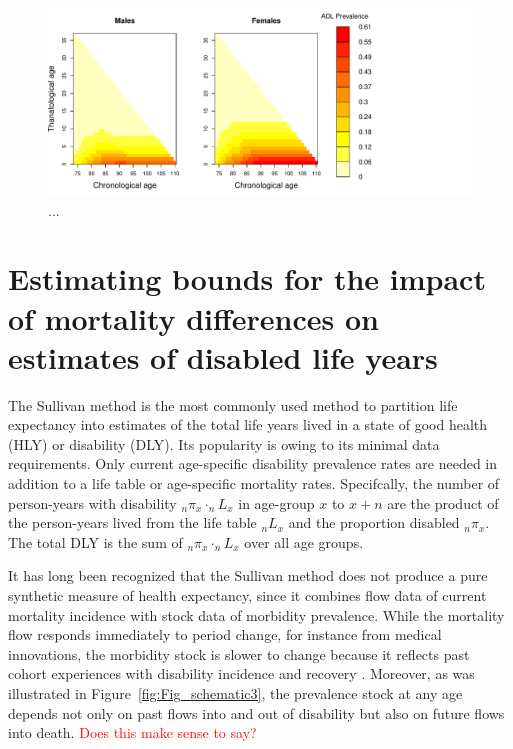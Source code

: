 \documentclass[11pt,oneside,a4paper]{article} %
\begin{document}
\begin{figure}
\begin{adjustwidth}{-1.5cm}{}
	\centering
	\includegraphics[scale=.8]{Fig_ADL_thana-chrono_rev.pdf}
	\caption{...}
	\label{fig:Fig_ADL_thana-chrono_rev}
\end{adjustwidth}
\end{figure}



\section{Estimating bounds for the impact of mortality differences on estimates of disabled life years}

The Sullivan method is the most commonly used method to partition life expectancy into estimates of the total life years lived in a state of good health (HLY) or disability (DLY). Its popularity is owing to its minimal data requirements. Only current age-specific disability prevalence rates are needed in addition to a life table or age-specific mortality rates. Specifcally, the number of person-years with disability $_{n}\pi _{x} \cdot _{n}L _{x}$ in age-group $x$ to $x+n$ are the product of the person-years lived from the life table $_{n}L _{x}$ and the proportion disabled $_{n}\pi _{x}$. The total DLY is the sum of  $_{n}\pi _{x} \cdot _{n}L _{x}$ over all age groups.

It has long been recognized that the Sullivan method does not produce a pure synthetic measure of health expectancy, since it combines flow data of current mortality incidence with stock data of morbidity prevalence. While the mortality flow responds immediately to period change, for instance from medical innovations, the morbidity stock is slower to change because it reflects past cohort experiences with disability incidence and recovery \citep{Mathers1997,Barendregt1994}. Moreover, as was illustrated in Figure~\ref{fig:Fig_schematic3}, the prevalence stock at any age depends not only on past flows into and out of disability but also on future flows into death. \textcolor{red}{Does this make sense to say?}
\end{document}
